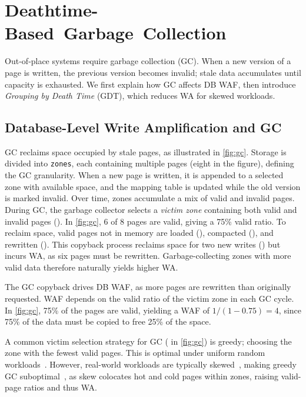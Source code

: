 \section{\mbox{Deathtime-Based Garbage Collection}}\label{sec:GDT}
Out‑of‑place systems require garbage collection (GC).
When a new version of a page is written, the previous version becomes invalid; 
stale data accumulates until capacity is exhausted.
We first explain how GC affects DB WAF, then introduce \emph{Grouping by Death Time} (GDT), 
which reduces WA for skewed workloads.

\subsection{Database-Level Write Amplification and GC}\label{sec:gc}

GC reclaims space occupied by stale pages, as illustrated in \cref{fig:gc}.  
Storage is divided into {\tt zones}, each containing multiple pages (eight in the figure), defining the GC granularity.  
When a new page is written, it is appended to a selected zone with available space, and the mapping table is updated while the old version is marked invalid.  
Over time, zones accumulate a mix of valid and invalid pages.
During GC, the garbage collector selects a \emph{victim zone} containing both valid and invalid pages ().  
In \cref{fig:gc}, 6 of 8 pages are valid, giving a 75\% valid ratio.
To reclaim space, valid pages not in memory are loaded (), compacted (), and rewritten ().
This copyback process reclaims space for two new writes () but incurs WA, as six pages must be rewritten.
Garbage-collecting zones with more valid data therefore naturally yields higher WA.

The GC copyback drives DB WAF, as more pages are rewritten than originally requested.
WAF depends on the valid ratio of the victim zone in each GC cycle.
In \cref{fig:gc}, 75\% of the pages are valid, yielding a WAF of $1/(1-0.75)=4$, since 75\% of the data must be copied to free 25\% of the space.

A common victim selection strategy for GC ( in \cref{fig:gc}) is greedy; choosing the zone with the fewest valid pages.
This is optimal under uniform random workloads~\cite{DBLP:journals/cacm/LangeNY23, ssdiq}.
However, real-world workloads are typically skewed~\cite{DBLP:journals/tos/YadgarGJS21}, 
making greedy GC suboptimal~\cite{DBLP:journals/pvldb/KangCOL20, ssdiq}, as skew colocates hot and cold pages within zones, raising valid-page ratios and thus WA.

